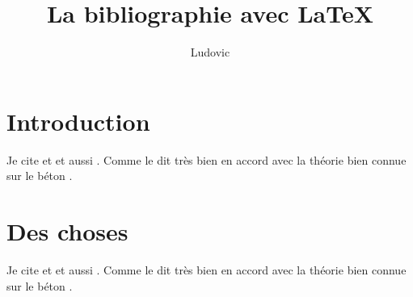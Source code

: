 \documentclass[10pt,a4paper,twoside,twocolumn,titlepage]{report}
\author{Ludovic}
\title{La bibliographie avec \LaTeX}
\begin{document}
\maketitle
\tableofcontents

\chapter{Introduction}
Je cite \cite{hawking1974black} et \cite{Einstein1935PR} et aussi \cite{torkabadi_constitutive_2018}. Comme le dit très bien \citet{hawking1974black} en accord avec la théorie bien connue sur le béton \citep{Einstein1935PR, torkabadi_constitutive_2018}.


\chapter{Des choses}

Je cite \cite{hawking1974black} et \cite{Einstein1935PR} et aussi \cite{torkabadi_constitutive_2018}. Comme le dit très bien \citet{hawking1974black} en accord avec la théorie bien connue sur le béton \citep{Einstein1935PR, torkabadi_constitutive_2018}.




\end{document}

